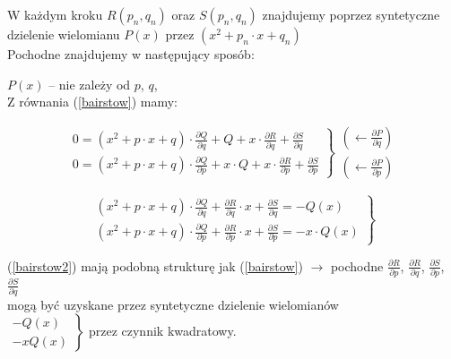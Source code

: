\begin{frame}
 W każdym kroku $ R(p_n,q_n)$ oraz  $S(p_n,q_n)$ znajdujemy poprzez  syntetyczne dzielenie wielomianu $P(x)$ przez $(x^2 + p_n \cdot x + q_n)$\\
  
  Pochodne znajdujemy w następujący sposób:

  $P(x)$ -- nie zależy od $p$, $q$, \\ Z równania (\ref{bairstow}) mamy:

  $$\left. \begin{array}{l}
  0 = (x^2 + p \cdot x + q) \cdot \frac{{\partial}Q}{{\partial}q} + Q + x \cdot \frac{{\partial}R}{{\partial}q} + \frac{{\partial}S}{{\partial}q} \\
  0 = (x^2 + p \cdot x + q) \cdot \frac{{\partial}Q}{{\partial}p} + x \cdot Q + x \cdot \frac{{\partial}R}{{\partial}p} + \frac{{\partial}S}{{\partial}p}
  \end{array}\right\}
  \begin{array}{l}
    \left( \leftarrow \frac{{\partial}P}{{\partial}q} \right) \\
    \left( \leftarrow \frac{{\partial}P}{{\partial}p} \right)
  \end{array}$$

  \begin{equation}
    \left. \begin{array}{l}
    (x^2 + p \cdot x + q) \cdot \frac{{\partial}Q}{{\partial}q} + \frac{{\partial}R}{{\partial}q} \cdot x + \frac{{\partial}S}{{\partial}q} = -Q(x) \\
    (x^2 + p \cdot x + q) \cdot \frac{{\partial}Q}{{\partial}p} + \frac{{\partial}R}{{\partial}p} \cdot x + \frac{{\partial}S}{{\partial}p} = -x \cdot Q(x)
    \end{array}\right\}
    \label{bairstow2}
  \end{equation}
\end{frame}

\begin{frame}
  (\ref{bairstow2}) mają podobną strukturę jak (\ref{bairstow}) $\rightarrow$ pochodne $\frac{{\partial}R}{{\partial}p}$, $\frac{{\partial}R}{{\partial}q}$, $\frac{{\partial}S}{{\partial}p}$, $\frac{{\partial}S}{{\partial}q}$ \\ \vspace{2mm} mogą być uzyskane przez syntetyczne dzielenie wielomianów \\ \vspace{3mm} $\left.\begin{array}{l} -Q(x) \\ -x Q(x) \end{array} \right\}$ przez czynnik kwadratowy.
\end{frame}
